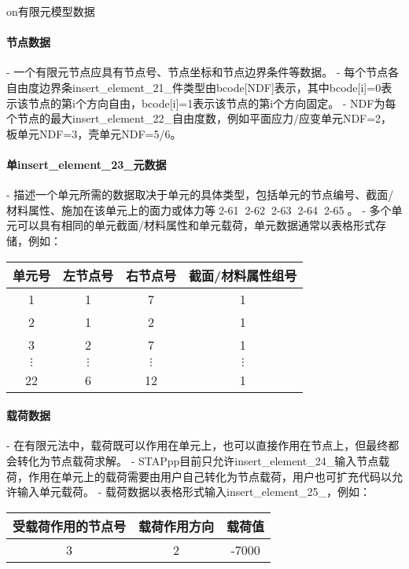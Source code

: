 \documentclass{article}
\begin{document}
on{有限元模型数据}
\paragraph{节点数据}
- 一个有限元节点应具有节点号、节点坐标和节点边界条件等数据。
- 每个节点各自由度边界条{insert\_element\_21\_}件类型由bcode[NDF]表示，其中bcode[i]=0表示该节点的第i个方向自由，bcode[i]=1表示该节点的第i个方向固定。
- NDF为每个节点的最大{insert\_element\_22\_}自由度数，例如平面应力/应变单元NDF=2，板单元NDF=3，壳单元NDF=5/6。

\paragraph{单{insert\_element\_23\_}元数据}
- 描述一个单元所需的数据取决于单元的具体类型，包括单元的节点编号、截面/材料属性、施加在该单元上的面力或体力等🔶2-61🔶🔶2-62🔶🔶2-63🔶🔶2-64🔶🔶2-65🔶。
- 多个单元可以具有相同的单元截面/材料属性和单元载荷，单元数据通常以表格形式存储，例如：

\begin{center}
\begin{tabular}{|c|c|c|c|}
\hline
单元号 & 左节点号 & 右节点号 & 截面/材料属性组号 \\
\hline
1 & 1 & 7 & 1 \\
\hline
2 & 1 & 2 & 1 \\
\hline
3 & 2 & 7 & 1 \\
\hline
$\vdots$ & $\vdots$ & $\vdots$ & $\vdots$ \\
\hline
22 & 6 & 12 & 1 \\
\hline
\end{tabular}
\end{center}

\paragraph{载荷数据}
- 在有限元法中，载荷既可以作用在单元上，也可以直接作用在节点上，但最终都会转化为节点载荷求解。
- STAPpp目前只允许{insert\_element\_24\_}输入节点载荷，作用在单元上的载荷需要由用户自己转化为节点载荷，用户也可扩充代码以允许输入单元载荷。
- 载荷数据以表格形式输入{insert\_element\_25\_}，例如：

\begin{center}
\begin{tabular}{|c|c|c|}
\hline
受载荷作用的节点号 & 载荷作用方向 & 载荷值 \\
\hline
3 & 2 & -7000 \\
\hline
\end{tabular}
\end{center}
\end{document}
